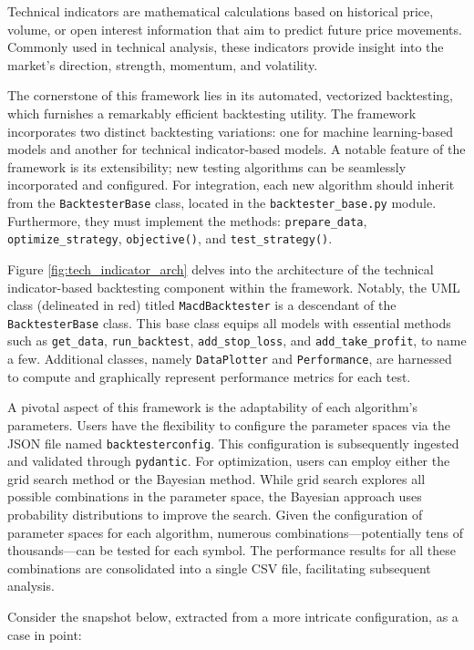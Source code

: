 \noindent
Technical indicators are mathematical calculations based on historical price, volume, or open interest information that aim to predict future price movements.
Commonly used in technical analysis, these indicators provide insight into the market's direction, strength, momentum, and volatility.

The cornerstone of this framework lies in its automated, vectorized backtesting, which furnishes a remarkably efficient backtesting utility.
The framework incorporates two distinct backtesting variations: one for machine learning-based models and another for technical indicator-based models.
A notable feature of the framework is its extensibility; new testing algorithms can be seamlessly incorporated and configured.
For integration, each new algorithm should inherit from the \texttt{BacktesterBase} class, located in the \texttt{backtester\_base.py} module.
Furthermore, they must implement the methods: \texttt{prepare\_data}, \texttt{optimize\_strategy}, \texttt{objective()}, and \texttt{test\_strategy()}.

Figure \ref{fig:tech_indicator_arch} delves into the architecture of the technical indicator-based backtesting component within the framework.
Notably, the UML class (delineated in red) titled \texttt{MacdBacktester} is a descendant of the \texttt{BacktesterBase} class.
This base class equips all models with essential methods such as \texttt{get\_data}, \texttt{run\_backtest}, \texttt{add\_stop\_loss}, and \texttt{add\_take\_profit}, to name a few.
Additional classes, namely \texttt{DataPlotter} and \texttt{Performance}, are harnessed to compute and graphically represent performance metrics for each test.

A pivotal aspect of this framework is the adaptability of each algorithm's parameters.
Users have the flexibility to configure the parameter spaces via the JSON file named \texttt{backtesterconfig}.
This configuration is subsequently ingested and validated through \texttt{pydantic}.
For optimization, users can employ either the grid search method or the Bayesian method.
While grid search explores all possible combinations in the parameter space, the Bayesian approach uses probability distributions to improve the search.
Given the configuration of parameter spaces for each algorithm, numerous combinations---potentially tens of thousands---can be tested for each symbol.
The performance results for all these combinations are consolidated into a single CSV file, facilitating subsequent analysis.

Consider the snapshot below, extracted from a more intricate configuration, as a case in point:

